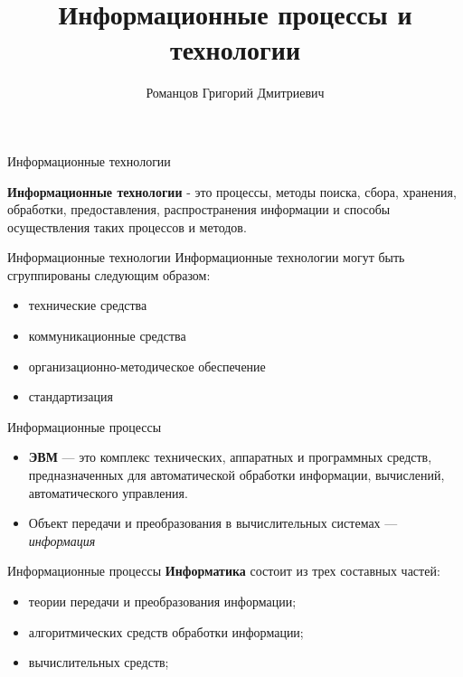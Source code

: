 \documentclass[10pt,pdf,hyperref={unicode}]{beamer}%
\title{Информационные процессы и технологии}
\author{Романцов Григорий Дмитриевич}
\date{}
\begin{document}

\begin{frame}%
  \titlepage
\end{frame}

\begin{frame}{Информационные технологии}

\textbf{Информационные технологии} - это процессы, методы поиска, сбора, хранения, обработки, предоставления, распространения информации и способы осуществления таких процессов и методов.

\end{frame}

\begin{frame}{Информационные технологии}
  Информационные технологии могут быть сгруппированы следующим образом:
  \begin{itemize}
    \item технические средства
    \item коммуникационные средства
    \item организационно-методическое обеспечение
    \item стандартизация
  \end{itemize}
\end{frame}

\begin{frame}{Информационные процессы}
  \begin{itemize}
    \item{\textbf{ЭВМ}} --- это комплекс технических, аппаратных и программных средств, предназначенных для автоматической обработки информации, вычислений, автоматического управления.
    \item Объект передачи и преобразования в вычислительных системах --- \textit{информация}
  \end{itemize}
\end{frame}

\begin{frame}{Информационные процессы}
  \textbf{Информатика} состоит из трех составных частей:
  \begin{itemize}
    \item теории передачи и преобразования информации;
    \item алгоритмических средств обработки информации;
    \item вычислительных средств;
  \end{itemize}
\end{frame}
\end{document}
